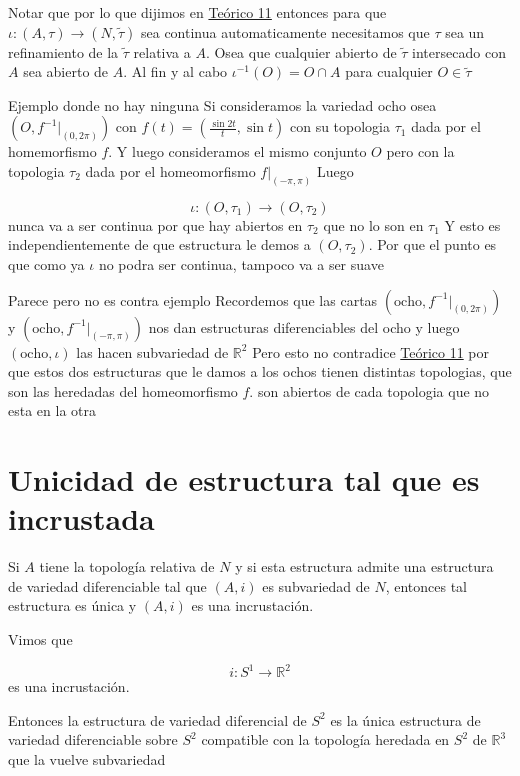 \label{blk:1933b9}
\begin{bookremark}{}
Notar que por lo que dijimos en \hyperref[blk:a7e6ec]{Teórico 11} entonces para que $\iota: (A,\tau)\rightarrow (N,\tilde{\tau})$ sea continua automaticamente necesitamos que $\tau$ sea un refinamiento de la $\tilde{\tau}$ relativa a $A$. Osea que cualquier abierto de $\tilde{\tau}$ intersecado con $A$ sea abierto de $A$. Al fin y al cabo $\iota ^{-1}(O)=O\cap A$ para cualquier $O \in  \tilde{\tau}$

\end{bookremark}
\begin{bookexample}{Ejemplo donde no hay ninguna}
Si consideramos la variedad ocho osea $(O,f^{-1}|_{(0,2\pi)})$ con $f(t)=(\frac{\sin 2t}{t},\sin t)$ con su topologia $\tau_{1}$  dada por el homemorfismo $f$. Y luego consideramos el mismo conjunto $O$ pero con la topologia $\tau_{2}$ dada por el homeomorfismo $f|_{(-\pi,\pi)}$ Luego

\[
\iota : (O,\tau_{1})\rightarrow (O,\tau_{2})
\]
nunca va a ser continua por que hay abiertos en $\tau_{2}$ que no lo son en $\tau_{1}$ Y esto es independientemente de que estructura le demos a $(O,\tau_{2})$. Por que el punto es que como ya $\iota$ no podra ser continua, tampoco va a ser suave

\end{bookexample}
\begin{bookexample}{Parece pero no es contra ejemplo}
Recordemos que las cartas $(\text{ocho},f^{-1}|_{(0,2\pi)})$ y $(\text{ocho},f^{-1}|_{(-\pi,\pi)})$ nos dan estructuras diferenciables del ocho y luego $(\text{ocho},\iota)$ las hacen subvariedad de $\mathbb{R}^{2}$ Pero esto no contradice \hyperref[blk:1933b9]{Teórico 11} por que estos dos estructuras que le damos a los ochos tienen distintas topologias, que son las heredadas del homeomorfismo $f$. 
 son abiertos de cada topologia que no esta en la otra

\end{bookexample}
\section{Unicidad de estructura tal que es incrustada}
\begin{bookcorollary}{}
Si $A$ tiene la topología relativa de $N$ y si esta estructura admite una estructura de variedad diferenciable tal que $(A,i)$ es subvariedad de $N$, entonces tal estructura es única y $(A,i)$ es una incrustación.

\end{bookcorollary}
\begin{bookexample}{}
Vimos que

\[
i:S^1\to\mathbb R^2
\]
es una incrustación.

Entonces la estructura de variedad diferencial de $S^2$ es la única estructura de variedad diferenciable sobre $S^{2}$ compatible con la topología heredada en $S^{2}$ de $\mathbb R^3$ que la vuelve subvariedad

\end{bookexample}
